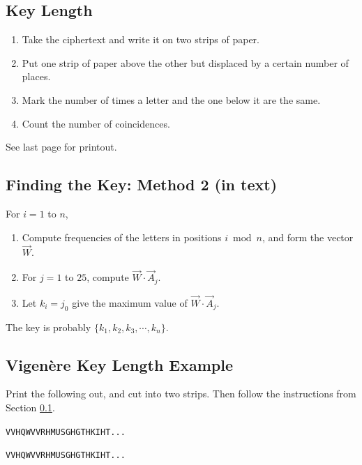 \documentclass[12pt]{amsart}
\theoremstyle{plain}
\theoremstyle{definition}
\theoremstyle{remark}
\newcommand{\ben}{\begin{enumerate}}
\newcommand{\een}{\end{enumerate}}
\begin{document}
\subsection{Key Length} \label{keylength}
\ben[1.]
	\item Take the ciphertext and write it on two strips of paper.
	\item Put one strip of paper above the other but displaced by a certain number of places.
	\item Mark the number of times a letter and the one below it are the same.
	\item Count the number of coincidences.
\een

See last page for printout.

\subsection{Finding the Key: Method 2 (in text)}
For $i = 1$ to $n$,
\ben[1.]
	\item Compute frequencies of the letters in positions $i \bmod n$, and form the vector $\vec{W}$.
	\item For $j = 1$ to $25$, compute $\vec{W} \cdot \vec{A}_j$.
	\item Let $k_i = j_0$ give the maximum value of $\vec{W} \cdot \vec{A}_j$.
\een
The key is probably $\{k_1,k_2,k_3, \cdots, k_n\}$.


\newpage
\begin{landscape}
\section{Vigen\`{e}re Key Length Example}
Print the following out, and cut into two strips.  Then follow the instructions from Section \ref{keylength}.\\
\vspace{.5in}

{\fontsize{.65in}{.5in}\selectfont \texttt{VVHQWVVRHMUSGHGTHKIHT...}}
\vspace{.5in}

{\fontsize{.65in}{.5in}\selectfont \texttt{VVHQWVVRHMUSGHGTHKIHT...}}

\end{landscape}
	
\end{document}
